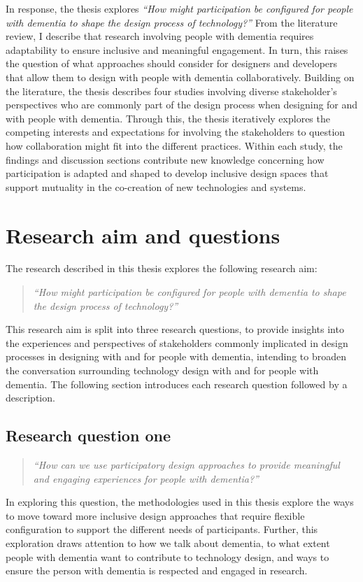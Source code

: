 In response, the thesis explores \textit{``How might participation be configured for people with dementia to shape the design process of technology?''} From the literature review, I describe that research involving people with dementia requires adaptability to ensure inclusive and meaningful engagement. In turn, this raises the question of what approaches should consider for designers and developers that allow them to design with people with dementia collaboratively. Building on the literature, the thesis describes four studies involving diverse stakeholder's perspectives who are commonly part of the design process when designing for and with people with dementia. Through this, the thesis iteratively explores the competing interests and expectations for involving the stakeholders to question how collaboration might fit into the different practices. Within each study, the findings and discussion sections contribute new knowledge concerning how participation is adapted and shaped to develop inclusive design spaces that support mutuality in the co-creation of new technologies and systems.


\section{Research aim and questions}
\label{Intro:RQ}
The research described in this thesis explores the following research aim:
\begin{quote}
    \textit{``How might participation be configured for people with dementia to shape the design process of technology?''}
\end{quote}
This research aim is split into three research questions, to provide insights into the experiences and perspectives of stakeholders commonly implicated in design processes in designing with and for people with dementia, intending to broaden the conversation surrounding technology design with and for people with dementia. The following section introduces each research question followed by a description.

\subsection{Research question one}
\label{RQ1}
\begin{quote}
\textit{``How can we use participatory design approaches to provide meaningful and engaging experiences for people with dementia?''}
\end{quote}
In exploring this question, the methodologies used in this thesis explore the ways to move toward more inclusive design approaches that require flexible configuration to support the different needs of participants. Further, this exploration draws attention to how we talk about dementia, to what extent people with dementia want to contribute to technology design, and ways to ensure the person with dementia is respected and engaged in research.

